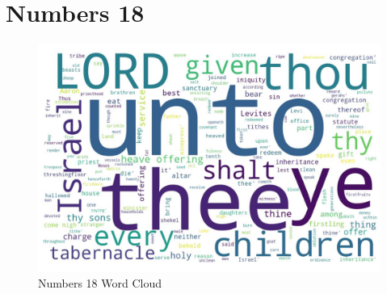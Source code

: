 \chapter{Numbers 18}

\begin{figure}
  \includegraphics[width=\linewidth]{04OT-Numbers/Numbers18-WordCloud.jpg}
  \caption{Numbers 18 Word Cloud}
  \label{fig:Numbers 18 word Cloud}
\end{figure}


